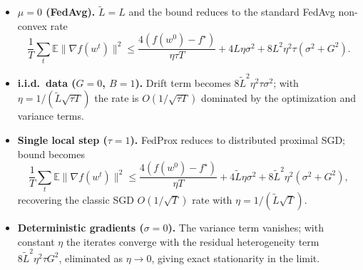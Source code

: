\documentclass{article}
\begin{document}
\begin{itemize}
\item \textbf{$\mu = 0$ (FedAvg).} $\tilde L = L$ and the bound reduces to the standard FedAvg non-convex rate
\[
\frac{1}{T}\sum_t \mathbb{E}\|\nabla f(w^t)\|^2 \le \frac{4(f(w^0)-f^\star)}{\eta\tau T} + 4L\eta\sigma^2 + 8L^2\eta^2\tau(\sigma^2+G^2).
\]
\item \textbf{i.i.d.\ data ($G=0$, $B=1$).} Drift term becomes $8\tilde L^2\eta^2\tau\sigma^2$; with $\eta=1/(\tilde L\sqrt{\tau T})$ the rate is $O(1/\sqrt{\tau T})$ dominated by the optimization and variance terms.
\item \textbf{Single local step ($\tau = 1$).} FedProx reduces to distributed proximal SGD; bound becomes
\[
\frac{1}{T}\sum_t\mathbb{E}\|\nabla f(w^t)\|^2 \le \frac{4(f(w^0)-f^\star)}{\eta T} + 4\tilde L\eta\sigma^2 + 8\tilde L^2\eta^2(\sigma^2+G^2),
\]
recovering the classic SGD $O(1/\sqrt{T})$ rate with $\eta = 1/(\tilde L\sqrt{T})$.
\item \textbf{Deterministic gradients ($\sigma=0$).} The variance term vanishes; with constant $\eta$ the iterates converge with the residual heterogeneity term $8\tilde L^2\eta^2\tau G^2$, eliminated as $\eta\to 0$, giving exact stationarity in the limit.
\end{itemize}
\end{document}
